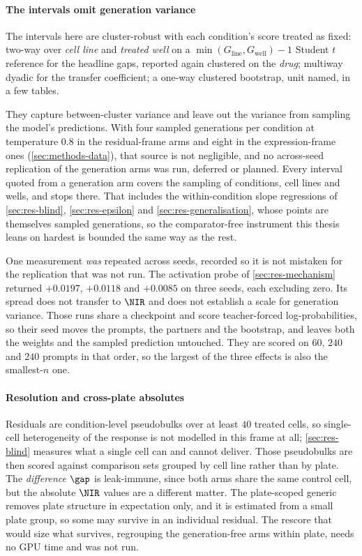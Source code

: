 \paragraph{The intervals omit generation variance} The intervals here are
cluster-robust with each condition's score treated as fixed: two-way over
\emph{cell line} and \emph{treated well} on a $\min(G_{\textrm{line}},
G_{\textrm{well}}) - 1$ Student $t$ reference for the headline gaps, reported
again clustered on the \emph{drug}; multiway dyadic for the transfer
coefficient; a one-way clustered bootstrap, unit named, in a few tables.

They capture between-cluster variance and leave out the variance from sampling
the model's predictions. With four sampled generations per condition at temperature
$0.8$ in the residual-frame arms and eight in the expression-frame ones
(\cref{sec:methods-data}), that source is not negligible, and no across-seed
replication of the generation arms was run, deferred or planned. Every interval
quoted from a generation arm covers the sampling of conditions, cell lines and
wells, and stops there. That includes the within-condition slope regressions of
\cref{sec:res-blind}, \cref{sec:res-epsilon} and \cref{sec:res-generalisation},
whose points are themselves sampled generations, so the comparator-free
instrument this thesis leans on hardest is bounded the same way as the rest.

One measurement \emph{was} repeated across seeds, recorded so it is not mistaken
for the replication that was not run. The activation probe of
\cref{sec:res-mechanism} returned $+0.0197$, $+0.0118$ and $+0.0085$ on three
seeds, each excluding zero. Its spread does not transfer to $\NIR$ and does not
establish a scale for generation variance. Those runs share a checkpoint and
score teacher-forced log-probabilities, so their seed moves the prompts, the
partners and the bootstrap, and leaves both the weights and the sampled
prediction untouched. They are scored on $60$, $240$ and $240$ prompts in that order, so
the largest of the three effects is also the smallest-$n$ one.

\paragraph{Resolution and cross-plate absolutes} Residuals are condition-level
pseudobulks over at least $40$ treated cells, so single-cell heterogeneity of the
response is not modelled in this frame at all; \cref{sec:res-blind} measures what
a single cell can and cannot deliver. Those pseudobulks are then scored against
comparison sets grouped by cell line rather than by plate. The \emph{difference}
$\gap$ is leak-immune, since both arms share the same control cell, but the
absolute $\NIR$ values are a different matter. The plate-scoped generic removes
plate structure in expectation only, and it is estimated from a small plate
group, so some may survive in an individual residual. The rescore that would size
what survives, regrouping the generation-free arms within plate, needs no GPU
time and was not run.

